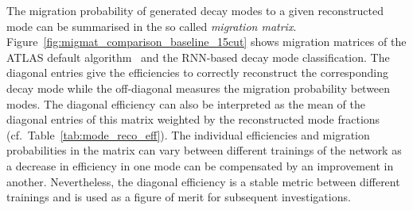 The migration probability of generated decay modes to a given reconstructed mode
can be summarised in the so called \emph{migration matrix}.
Figure~\ref{fig:migmat_comparison_baseline_15cut} shows migration matrices of
the ATLAS default algorithm~\cite{atlas:taurec:decaymodes} and the RNN-based
decay mode classification. The diagonal entries give the efficiencies to
correctly reconstruct the corresponding decay mode while the off-diagonal
measures the migration probability between modes. The diagonal efficiency can
also be interpreted as the mean of the diagonal entries of this matrix weighted
by the reconstructed mode fractions (cf.\ Table~\ref{tab:mode_reco_eff}). The
individual efficiencies and migration probabilities in the matrix can vary
between different trainings of the network as a decrease in efficiency in one
mode can be compensated by an improvement in another. Nevertheless, the diagonal
efficiency is a stable metric between different trainings and is used as a
figure of merit for subsequent investigations.

